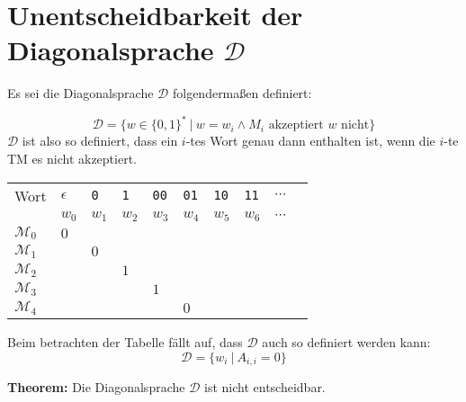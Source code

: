 \documentclass{scrartcl}%
\begin{document}

    \section*{Unentscheidbarkeit der Diagonalsprache $\mathcal{D}$}
    \label{sec:unentscheidbarkeitDerDiagonalsprache}
    Es sei die Diagonalsprache $\mathcal{D}$ folgendermaßen definiert:

    \begin{equation*}
        \mathcal{D} = \{ w \in \{0,1\}^* \ | \ w =w_i \land M_i \text{ akzeptiert } w \text{ nicht} \}
    \end{equation*}
    $\mathcal{D}$ ist also so definiert,
    dass ein $i$-tes Wort genau dann enthalten ist, wenn die $i$-te TM es nicht akzeptiert.

    \begin{table}[H]
        \centering
        \small
        \begin{tabular}{C{1.5em}|C{1.5em}C{1.5em}C{1.5em}C{1.5em}C{1.5em}C{1.5em}C{1.5em}C{1.5em}C{1.5em}}
            \tiny Wort & \tiny $\epsilon$ & \tiny\texttt{0} & \tiny\texttt{1} & \tiny\texttt{00} & \tiny\texttt{01} & \tiny\texttt{10} & \tiny\texttt{11} & \tiny$\cdots$ \\
            & $w_0$  & $w_1$ & $w_2$ & $w_3$ & $w_4$ & $w_5$ & $w_6$ & \tiny$\cdots$ \\ \hline
            $\mathcal{M}_0$  & $0$  & & & & & & & \\
            $\mathcal{M}_1$  & & $0$ & & & & & & \\
            $\mathcal{M}_2$  & & & $1$ & & & & & \\
            $\mathcal{M}_3$  & & & & $1$ & & & & \\
            $\mathcal{M}_4$  & & & & & $0$ & & & \\
        \end{tabular}
    \end{table}

    Beim betrachten der Tabelle fällt auf, dass $\mathcal{D}$ auch so definiert werden kann:
    \begin{equation*}
        \mathcal{D} = \{ w_i \ | \ A_{i,i} = 0 \}
    \end{equation*}

    \textbf{\textsf{Theorem:}} Die Diagonalsprache $\mathcal{D}$ ist nicht entscheidbar.
\end{document}
